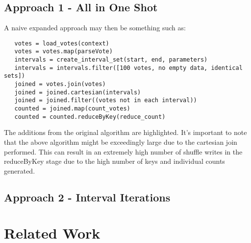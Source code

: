 \documentclass[11pt]{article}
\begin{document}
\subsection{Approach 1 - All in One Shot}

A naive expanded approach may then be something such as:

\begin{lstlisting}
   votes = load_votes(context)
   votes = votes.map(parseVote)
   intervals = create_interval_set(start, end, parameters)
   intervals = intervals.filter([100 votes, no empty data, identical sets])
   joined = votes.join(votes)
   joined = joined.cartesian(intervals)
   joined = joined.filter((votes not in each interval))
   counted = joined.map(count_votes)
   counted = counted.reduceByKey(reduce_count)
\end{lstlisting}
The additions from the original algorithm are highlighted. It’s important to note that the above algorithm might be exceedingly large due to the cartesian join performed. This can result in an extremely high number of shuffle writes in the reduceByKey stage due to the high number of keys and individual counts generated.

\subsection{Approach 2 - Interval Iterations}

\section{Related Work}



\end{document}
